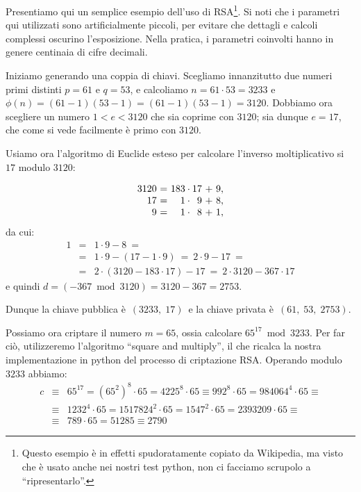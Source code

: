 \documentclass[pdflatex,11pt,a4paper,oneside]{article}
\newcommand{\p}[1]{\left({#1}\right)}
\newcommand{\ephi}[1]{\ensuremath{\phi\p{#1}}}
\newcommand{\congruent}[0]{\equiv}
\newcommand{\mmodop}[0]{\ensuremath{\operatorname{mod}}}
\newcommand{\rem}[2]{\ensuremath{{#1}\:\mmodop\:{#2}}}
\begin{document}
Presentiamo qui un semplice esempio dell'uso di RSA\footnote{Questo
esempio \`e in effetti spudoratamente copiato da Wikipedia, ma visto
che \`e usato anche nei nostri test python, non ci facciamo scrupolo
a ``ripresentarlo''.}. Si noti che i parametri qui utilizzati sono
artificialmente piccoli, per evitare che dettagli e calcoli complessi
oscurino l'esposizione. Nella pratica, i parametri coinvolti hanno
in genere centinaia di cifre decimali.

Iniziamo generando una coppia di chiavi. Scegliamo innanzitutto due numeri
primi distinti $p = 61$ e $q = 53$, e calcoliamo $n = 61 \cdot 53 = 3233$
e $\ephi{n} = (61 − 1)(53 − 1) = (61 − 1)(53 − 1) = 3120$. Dobbiamo ora
scegliere un numero $1 < e < 3120$ che sia coprime con $3120$; sia dunque
 $e = 17$, che come si vede facilmente \`e primo con $3120$.

Usiamo ora l'algoritmo di Euclide esteso per calcolare l'inverso
moltiplicativo si $17$ modulo $3120$:

\begin{displaymath}
  \begin{array}{r@{~=~}r@{\:\cdot\:}r@{~+~}r}
  3120 & 183 & 17 & 9, \\
    17 &   1 &  9 & 8, \\
     9 &   1 &  8 & 1, \\
  \end{array}
\end{displaymath}
da cui:
\begin{eqnarray*}
    1 & = & 1 \cdot 9 - 8 ~= \\
      & = & 1 \cdot 9 - \p{ 17 - 1 \cdot 9 }
      ~ = ~ 2 \cdot 9 - 17 ~= \\
      & = & 2 \cdot \p{ 3120 - 183 \cdot 17 } - 17
      ~ = ~ 2 \cdot 3120 - 367 \cdot 17
\end{eqnarray*}
e quindi $d = \p{\rem{-367}{3120}} = 3120 - 367 = 2753$.

\medskip\noindent
Dunque la chiave pubblica \`e \,$(3233,\;17)$\, e la chiave privata
\`e \,$(61,\;53,\;2753)$.

\medskip
Possiamo ora criptare il numero $m = 65$, ossia calcolare
$\rem{{65}^{17}}{3233}$. Per far ci\`o, utilizzeremo l'algoritmo ``square
and multiply'', il che ricalca la nostra implementazione in python del
processo di criptazione RSA. Operando modulo $3233$ abbiamo:
\begin{eqnarray*}
c & \congruent\!\! &
    65^{17} = {\p{{65^2}}}^8 \cdot 65 = 4225^8 \cdot 65
    \congruent 992^8 \cdot 65 = 984064^4 \cdot 65 \congruent
  \\
  & \congruent\!\! &
    1232^4 \cdot 65 = 1517824^2 \cdot 65 = 1547^2 \cdot 65
    = 2393209 \cdot 65 \congruent
  \\
  & \congruent\!\! &
    789 \cdot 65 = 51285 \congruent 2790
\end{eqnarray*}
\end{document}
